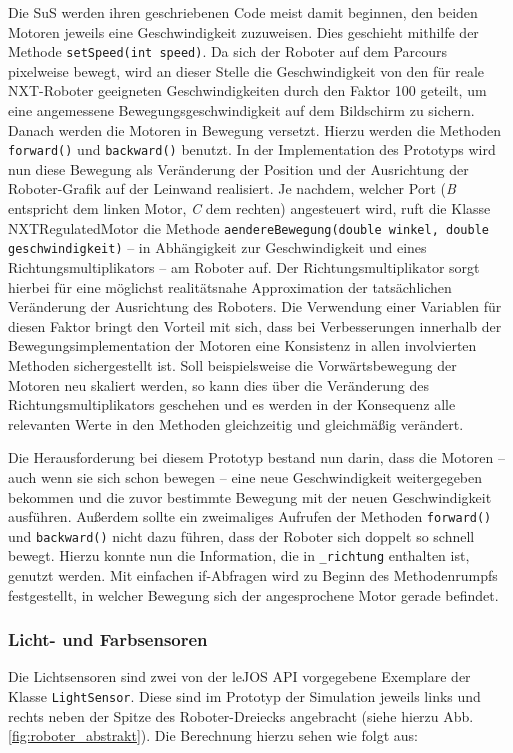 \documentclass[paper=a4, DIV=calc, BCOR=15mm, twoside=on, onecolumn=on, open = right, titlepage =on, parskip =half, headsepline = on, footsepline = on, chapterprefix = off, appendixprefix = off, fontsize = 12pt, numbers = noenddot, abstract = on]{scrbook}
\begin{document}
Die SuS werden ihren geschriebenen Code meist damit beginnen, den beiden Motoren jeweils eine Geschwindigkeit zuzuweisen. Dies geschieht mithilfe der Methode \texttt{setSpeed(int speed)}. Da sich der Roboter auf dem Parcours pixelweise bewegt, wird an dieser Stelle die Geschwindigkeit von den für reale NXT-Roboter geeigneten Geschwindigkeiten durch den Faktor 100 geteilt, um eine angemessene Bewegungsgeschwindigkeit auf dem Bildschirm zu sichern.\\
Danach werden die Motoren in Bewegung versetzt. Hierzu werden die Methoden \texttt{forward()} und \texttt{backward()} benutzt. In der Implementation des Prototyps wird nun diese Bewegung als Veränderung der Position und der Ausrichtung der Roboter-Grafik auf der Leinwand realisiert. Je nachdem, welcher Port (\emph{B} entspricht dem linken Motor, \emph{C} dem rechten) angesteuert wird, ruft die Klasse NXTRegulatedMotor die Methode \texttt{aendereBewegung(double winkel, double geschwindigkeit)} -- in Abhängigkeit zur Geschwindigkeit und eines Richtungsmultiplikators -- am Roboter auf. Der Richtungsmultiplikator sorgt hierbei für eine möglichst realitätsnahe Approximation der tatsächlichen Veränderung der Ausrichtung des Roboters. Die Verwendung einer Variablen für diesen Faktor bringt den Vorteil mit sich, dass bei Verbesserungen innerhalb der Bewegungsimplementation der Motoren eine Konsistenz in allen involvierten Methoden sichergestellt ist. Soll beispielsweise die Vorwärtsbewegung der Motoren neu skaliert werden, so kann dies über die Veränderung des Richtungsmultiplikators geschehen und es werden in der Konsequenz alle relevanten Werte in den Methoden gleichzeitig und gleichmäßig verändert. 

Die Herausforderung bei diesem Prototyp bestand nun darin, dass die Motoren -- auch wenn sie sich schon bewegen -- eine neue Geschwindigkeit weitergegeben bekommen und die zuvor bestimmte Bewegung mit der neuen Geschwindigkeit ausführen. Außerdem sollte ein zweimaliges Aufrufen der Methoden \texttt{forward()} und \texttt{backward()} nicht dazu führen, dass der Roboter sich doppelt so schnell bewegt. Hierzu konnte nun die Information, die in  \texttt{{\_}richtung} enthalten ist, genutzt werden. Mit einfachen if-Abfragen wird zu Beginn des Methodenrumpfs festgestellt, in welcher Bewegung sich der angesprochene Motor gerade befindet. 


\subsubsection{Licht- und Farbsensoren}
Die Lichtsensoren sind zwei von der leJOS API vorgegebene Exemplare der Klasse \texttt{LightSensor}. Diese sind im Prototyp der Simulation jeweils links und rechts neben der Spitze des Roboter-Dreiecks angebracht (siehe hierzu Abb. \ref{fig:roboter_abstrakt}). Die Berechnung hierzu sehen wie folgt aus:
\end{document}
